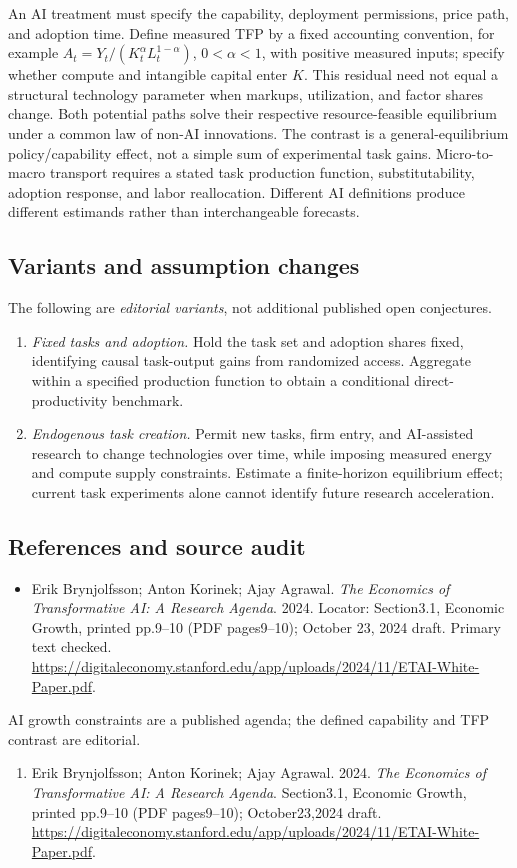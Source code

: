 \documentclass[11pt,a4paper]{article}
\begin{document}
An AI treatment must specify the capability, deployment permissions, price path, and adoption time. Define measured TFP by a fixed accounting convention, for example \(A_t=Y_t/(K_t^{\alpha}L_t^{1-\alpha})\), \(0<\alpha<1\), with positive measured inputs; specify whether compute and intangible capital enter \(K\). This residual need not equal a structural technology parameter when markups, utilization, and factor shares change. Both potential paths solve their respective resource-feasible equilibrium under a common law of non-AI innovations. The contrast is a general-equilibrium policy/capability effect, not a simple sum of experimental task gains. Micro-to-macro transport requires a stated task production function, substitutability, adoption response, and labor reallocation. Different AI definitions produce different estimands rather than interchangeable forecasts.
\subsection*{Variants and assumption changes}
The following are \emph{editorial variants}, not additional published open conjectures.
\begin{enumerate}
\item \emph{Fixed tasks and adoption.} Hold the task set and adoption shares fixed, identifying causal task-output gains from randomized access. Aggregate within a specified production function to obtain a conditional direct-productivity benchmark.
\item \emph{Endogenous task creation.} Permit new tasks, firm entry, and AI-assisted research to change technologies over time, while imposing measured energy and compute supply constraints. Estimate a finite-horizon equilibrium effect; current task experiments alone cannot identify future research acceleration.
\end{enumerate}
\subsection*{References and source audit}
\begin{itemize}
\item Erik Brynjolfsson; Anton Korinek; Ajay Agrawal. \emph{The Economics of Transformative AI: A Research Agenda}. 2024. Locator: Section3.1, Economic Growth, printed pp.9--10 (PDF pages9--10); October 23, 2024 draft. Primary text checked. \url{https://digitaleconomy.stanford.edu/app/uploads/2024/11/ETAI-White-Paper.pdf}.
\end{itemize}
AI growth constraints are a published agenda; the defined capability and TFP contrast are editorial.
\begin{enumerate}\raggedright
\item\hypertarget{definitions:source:30007544:1}{} Erik Brynjolfsson; Anton Korinek; Ajay Agrawal. 2024. \emph{The Economics of Transformative AI: A Research Agenda}. Section3.1, Economic Growth, printed pp.9--10 (PDF pages9--10); October23,2024 draft.
\url{https://digitaleconomy.stanford.edu/app/uploads/2024/11/ETAI-White-Paper.pdf}.
\end{enumerate}
\end{document}
